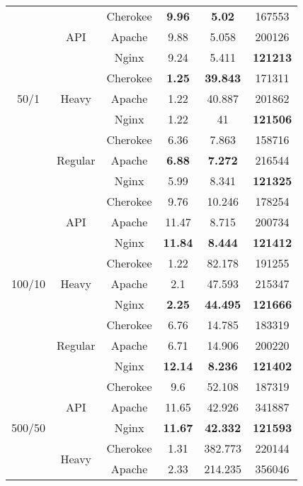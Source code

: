 \begin{center}
\begin{longtable}{c|c|c|c|c|c}
    \multirow{9}{*}{50/1} & \multirow{3}{*}{API} & Cherokee & \textbf{9.96} & \textbf{5.02} & 167553\\\cline{3-6}
     &  & Apache & 9.88 & 5.058 & 200126\\\cline{3-6}
     &  & Nginx & 9.24 & 5.411 & \textbf{121213}\\\cline{2-6}
     & \multirow{3}{*}{Heavy} & Cherokee & \textbf{1.25} & \textbf{39.843} & 171311\\\cline{3-6}
     &  & Apache & 1.22 & 40.887 & 201862\\\cline{3-6}
     &  & Nginx & 1.22 & 41 & \textbf{121506}\\\cline{2-6}
     & \multirow{3}{*}{Regular} & Cherokee & 6.36 & 7.863 & 158716\\\cline{3-6}
     &  & Apache & \textbf{6.88} & \textbf{7.272} & 216544\\\cline{3-6}
     &  & Nginx & 5.99 & 8.341 & \textbf{121325}\\\hline
    \multirow{9}{*}{100/10} & \multirow{3}{*}{API} & Cherokee & 9.76 & 10.246 & 178254\\\cline{3-6}
     &  & Apache & 11.47 & 8.715 & 200734\\\cline{3-6}
     &  & Nginx & \textbf{11.84} & \textbf{8.444} & \textbf{121412}\\\cline{2-6}
     & \multirow{3}{*}{Heavy} & Cherokee & 1.22 & 82.178 & 191255\\\cline{3-6}
     &  & Apache & 2.1 & 47.593 & 215347\\\cline{3-6}
     &  & Nginx & \textbf{2.25} & \textbf{44.495} & \textbf{121666}\\\cline{2-6}
     & \multirow{3}{*}{Regular} & Cherokee & 6.76 & 14.785 & 183319\\\cline{3-6}
     &  & Apache & 6.71 & 14.906 & 200220\\\cline{3-6}
     &  & Nginx & \textbf{12.14} & \textbf{8.236} & \textbf{121402}\\\hline
    \multirow{9}{*}{500/50} & \multirow{3}{*}{API} & Cherokee & 9.6 & 52.108 & 187319\\\cline{3-6}
     &  & Apache & 11.65 & 42.926 & 341887\\\cline{3-6}
     &  & Nginx & \textbf{11.67} & \textbf{42.332} & \textbf{121593}\\\cline{2-6}
     & \multirow{3}{*}{Heavy} & Cherokee & 1.31 & 382.773 & 220144\\\cline{3-6}
     &  & Apache & 2.33 & 214.235 & 356046\\\cline{3-6}

\end{longtable}
\end{center}
